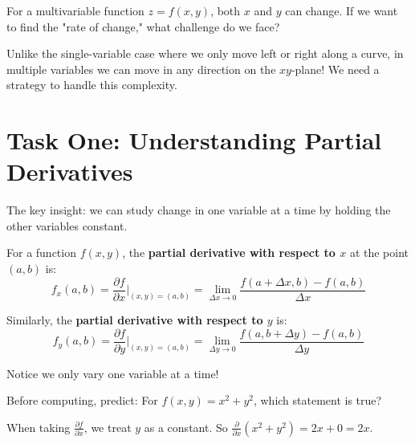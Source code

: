 \documentclass{ximera}
\begin{document}
\begin{problem}
For a multivariable function $z = f(x, y)$, both $x$ and $y$ can change. If we want to find the "rate of change," what challenge do we face?

\begin{multipleChoice}
\end{multipleChoice}

\begin{feedback}
Unlike the single-variable case where we only move left or right along a curve, in multiple variables we can move in any direction on the $xy$-plane! We need a strategy to handle this complexity.
\end{feedback}
\end{problem}

\section*{Task One: Understanding Partial Derivatives}

The key insight: we can study change in one variable at a time by holding the other variables constant.

\begin{definition}
For a function $f(x, y)$, the \textbf{partial derivative with respect to $x$} at the point $(a, b)$ is:
$$f_x(a,b)=\frac{\partial f}{\partial x}\bigg|_{(x,y)=(a,b)}=\lim_{\Delta x\rightarrow 0}\frac{f(a+\Delta x,b)-f(a,b)}{\Delta x}$$

Similarly, the \textbf{partial derivative with respect to $y$} is:
$$f_y(a,b)=\frac{\partial f}{\partial y}\bigg|_{(x,y)=(a,b)}=\lim_{\Delta y\rightarrow 0}\frac{f(a,b+\Delta y)-f(a,b)}{\Delta y}$$

Notice we only vary one variable at a time!
\end{definition}

\begin{problem}
Before computing, predict: For $f(x, y) = x^2 + y^2$, which statement is true?

\begin{multipleChoice}
\end{multipleChoice}

\begin{feedback}
When taking $\frac{\partial f}{\partial x}$, we treat $y$ as a constant. So $\frac{\partial}{\partial x}(x^2 + y^2) = 2x + 0 = 2x$.
\end{feedback}
\end{problem}
\end{document}
